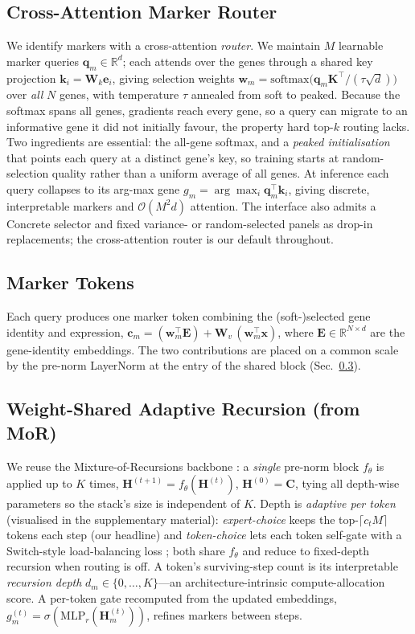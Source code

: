 \documentclass[letterpaper]{article}
\begin{document}
\subsection{Cross-Attention Marker Router}
We identify markers with a cross-attention \emph{router}. We maintain $M$ learnable
marker queries $\mathbf{q}_m \in \mathbb{R}^{d}$; each attends over the genes through a
shared key projection $\mathbf{k}_i = \mathbf{W}_k \mathbf{e}_i$, giving selection
weights
$\mathbf{w}_m = \mathrm{softmax}\big(\mathbf{q}_m \mathbf{K}^{\top}/(\tau\sqrt{d})\big)$
over \emph{all} $N$ genes, with temperature $\tau$ annealed from soft to peaked.
Because the softmax spans all genes, gradients reach every gene, so a query can
migrate to an informative gene it did not initially favour, the property hard top-$k$
routing lacks. Two ingredients are essential: the all-gene softmax, and a
\emph{peaked initialisation} that points each query at a distinct gene's key, so
training starts at random-selection quality rather than a uniform average of all
genes. At inference each query collapses to its arg-max gene
$g_m = \arg\max_i \mathbf{q}_m^{\top}\mathbf{k}_i$, giving discrete, interpretable
markers and $\mathcal{O}(M^2 d)$ attention. The interface also admits a Concrete
selector \cite{balin2019concrete,jang2017categorical} and fixed variance- or random-selected
panels as drop-in replacements; the cross-attention router is our default throughout.

\subsection{Marker Tokens}
Each query produces one marker token combining the (soft-)selected gene identity and
expression,
$\mathbf{c}_m = (\mathbf{w}_m^{\top}\mathbf{E}) + \mathbf{W}_v\,(\mathbf{w}_m^{\top}\mathbf{x})$,
where $\mathbf{E}\in\mathbb{R}^{N\times d}$ are the gene-identity embeddings. The two
contributions are placed on a common scale by the pre-norm LayerNorm at the entry of
the shared block (Sec.~\ref{sec:rec}).

\subsection{Weight-Shared Adaptive Recursion (from MoR)}
\label{sec:rec}
We reuse the Mixture-of-Recursions backbone \cite{bae2025mixture}: a \emph{single} pre-norm
block $f_\theta$ is applied up to $K$ times, $\mathbf{H}^{(t+1)}=f_\theta(\mathbf{H}^{(t)})$,
$\mathbf{H}^{(0)}=\mathbf{C}$, tying all depth-wise parameters
\cite{dehghani2019universal,lan2020albert} so the stack's size is independent of $K$. Depth
is \emph{adaptive per token} (visualised in the supplementary material): \emph{expert-choice} keeps the
top-$\lceil c_t M\rceil$ tokens each step (our headline) and \emph{token-choice} lets each
token self-gate with a Switch-style load-balancing loss \cite{shazeer2017outrageously}; both
share $f_\theta$ and reduce to fixed-depth recursion when routing is off. A token's
surviving-step count is its interpretable \emph{recursion depth} $d_m\in\{0,\dots,K\}$---an
architecture-intrinsic compute-allocation score. A per-token gate recomputed from the updated
embeddings, $g^{(t)}_m=\sigma(\mathrm{MLP}_r(\mathbf{H}^{(t)}_m))$, refines markers between
steps.
\end{document}

